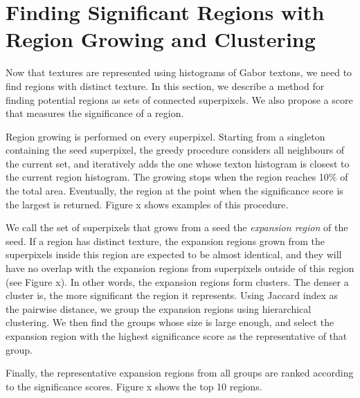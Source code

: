 \documentclass{llncs}
\begin{document}
\section{Finding Significant Regions with Region Growing and Clustering}

Now that textures are represented using histograms of Gabor textons, we need to find regions with distinct texture. In this section, we describe a method for finding potential regions as sets of connected superpixels. We also propose a score that measures the significance of a region.
 
Region growing is performed on every superpixel. Starting from a singleton containing the seed superpixel, the greedy procedure considers all neighbours of the current set, and iteratively adds the one whose texton histogram is closest to the current region histogram. The growing stops when the region reaches 10\% of the total area. Eventually, the region at the point when the significance score is the largest is returned. Figure x shows examples of this procedure.


We call the set of superpixels that grows from a seed the \textit{expansion region} of the seed. If a region has distinct texture, the expansion regions grown from the superpixels inside this region are expected to be almost identical, and they will have no overlap with the expansion regions from superpixels outside of this region (see Figure x). In other words, the expansion regions form clusters. The denser a cluster is, the more significant the region it represents. Using Jaccard index as the pairwise distance, we group the expansion regions using hierarchical clustering. We then find the groups whose size is large enough, and select the expansion region with the highest significance score as the representative of that group.

Finally, the representative expansion regions from all groups are ranked according to the significance scores. Figure x shows the top 10 regions.
\end{document}
